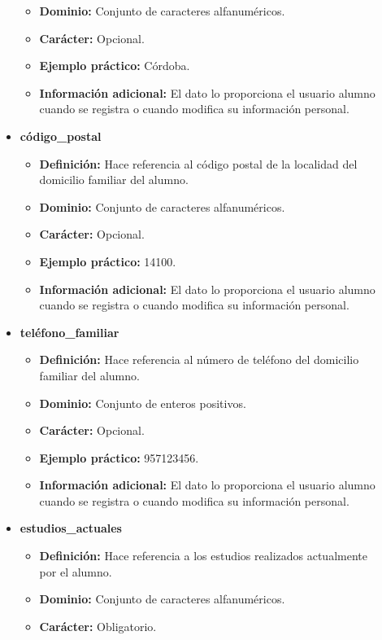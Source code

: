 \begin{description}
\begin{itemize}
\begin{itemize}
         \item \textbf{Dominio:} Conjunto de caracteres alfanuméricos.
         \item \textbf{Carácter:}  Opcional.
         \item \textbf{Ejemplo práctico:} Córdoba.
         \item \textbf{Información adicional:} El dato lo proporciona el usuario alumno cuando se registra o cuando modifica su información personal.
      \end{itemize}
   \item \textbf{código\_postal}
      \begin{itemize}
         \item \textbf{Definición:} Hace referencia al código postal de la localidad del domicilio familiar del alumno.
         \item \textbf{Dominio:} Conjunto de caracteres alfanuméricos.
         \item \textbf{Carácter:}  Opcional.
         \item \textbf{Ejemplo práctico:} 14100.
         \item \textbf{Información adicional:} El dato lo proporciona el usuario alumno cuando se registra o cuando modifica su información personal.
      \end{itemize}
   \item \textbf{teléfono\_familiar}
      \begin{itemize}
         \item \textbf{Definición:} Hace referencia al número de teléfono del domicilio familiar del alumno.
         \item \textbf{Dominio:} Conjunto de enteros positivos.
         \item \textbf{Carácter:}  Opcional.
         \item \textbf{Ejemplo práctico:} 957123456.
         \item \textbf{Información adicional:} El dato lo proporciona el usuario alumno cuando se registra o cuando modifica su información personal.
      \end{itemize}
   \item \textbf{estudios\_actuales}
      \begin{itemize}
         \item \textbf{Definición:} Hace referencia a los estudios realizados actualmente por el alumno.
         \item \textbf{Dominio:} Conjunto de caracteres alfanuméricos.
         \item \textbf{Carácter:}  Obligatorio.

\end{itemize}
\end{itemize}
\end{description}
